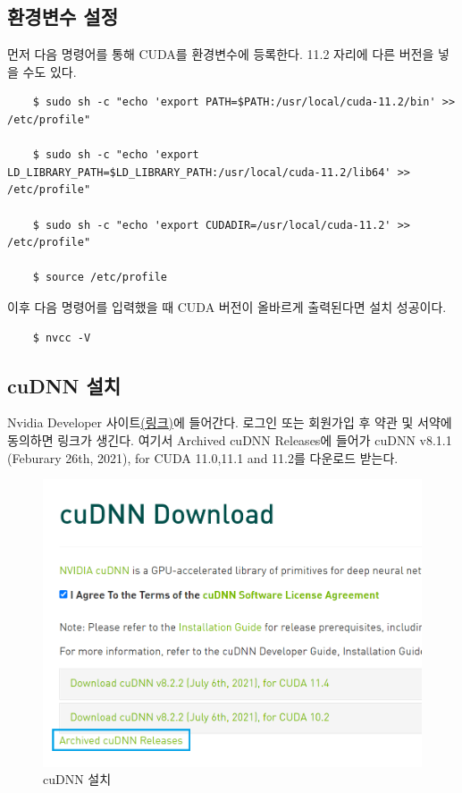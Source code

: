 \subsection{환경변수 설정}
먼저 다음 명령어를 통해 CUDA를 환경변수에 등록한다. 11.2 자리에 다른 버전을 넣을 수도 있다.
\begin{lstlisting}
    $ sudo sh -c "echo 'export PATH=$PATH:/usr/local/cuda-11.2/bin' >> /etc/profile"

    $ sudo sh -c "echo 'export LD_LIBRARY_PATH=$LD_LIBRARY_PATH:/usr/local/cuda-11.2/lib64' >> /etc/profile"

    $ sudo sh -c "echo 'export CUDADIR=/usr/local/cuda-11.2' >> /etc/profile"

    $ source /etc/profile
\end{lstlisting}
이후 다음 명령어를 입력했을 때 CUDA 버전이 올바르게 출력된다면 설치 성공이다.
\begin{lstlisting}
    $ nvcc -V
\end{lstlisting}
\subsection{cuDNN 설치}
Nvidia Developer 사이트\href{https://developer.nvidia.com/cudnn}{(링크)}에 들어간다.
로그인 또는 회원가입 후 약관 및 서약에 동의하면 링크가 생긴다. 여기서 Archived cuDNN Releases에 들어가 cuDNN v8.1.1 (Feburary 26th, 2021), for CUDA 11.0,11.1 and 11.2를 다운로드 받는다.
\begin{figure}[H]
	\begin{center}
        \includegraphics[width=12cm]{cudnn1}
        \caption{cuDNN 설치}
    \end{center}
\end{figure}

